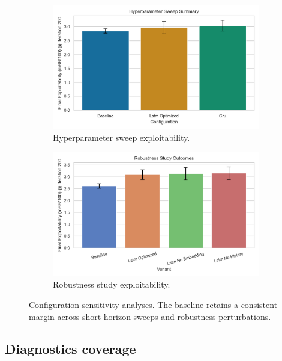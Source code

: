 \documentclass[10pt,twocolumn]{article}
\theoremstyle{definition}
\begin{document}
\begin{figure}[t]
    \centering
    \begin{subfigure}[t]{0.48\textwidth}
        \includegraphics[width=\linewidth]{plots/hyperparameter_sweep.png}
        \caption{Hyperparameter sweep exploitability.}
        \label{fig:hyperparameter_summary}
    \end{subfigure}
    \hfill
    \begin{subfigure}[t]{0.48\textwidth}
        \includegraphics[width=\linewidth]{plots/robustness_summary.png}
        \caption{Robustness study exploitability.}
        \label{fig:robustness_summary}
    \end{subfigure}
    \caption{Configuration sensitivity analyses. The baseline retains a consistent margin across short-horizon sweeps and robustness perturbations.}
    \label{fig:sweep_results}
\end{figure}

\subsection{Diagnostics coverage}
\end{document}
